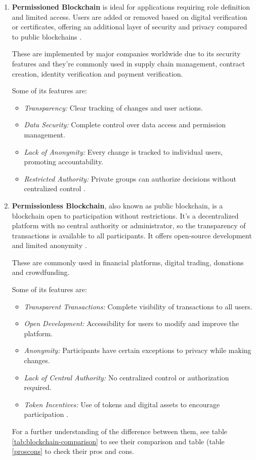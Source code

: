 \begin{enumerate}
    \item \textbf{Permissioned Blockchain} is ideal for applications requiring role definition and limited access. Users are added or removed based on digital verification or certificates, offering an additional layer of security and privacy compared to public blockchains \cite{bc_types, perm_bc}.

These are implemented by major companies worldwide due to its security features and they're commonly used in supply chain management, contract creation, identity verification and payment verification.

Some of its features are:

\begin{itemize}
    \item \textit{Transparency:} Clear tracking of changes and user actions.
    \item \textit{Data Security:} Complete control over data access and permission management.
    \item \textit{Lack of Anonymity:} Every change is tracked to individual users, promoting accountability.
    \item \textit{Restricted Authority:} Private groups can authorize decisions without centralized control \cite{perm_bc}.
\end{itemize}

    \item \textbf{Permissionless Blockchain}, also known as public blockchain, is a blockchain open to participation without restrictions. It's a decentralized platform with no central authority or administrator, so the transparency of transactions is available to all participants.
It offers open-source development and limited anonymity \cite{bc_types, perm_bc}.


These are commonly used in financial platforms, digital trading, donations and crowdfunding.\newline

Some of its features are:

\begin{itemize}
    \item \textit{Transparent Transactions:} Complete visibility of transactions to all users.
    \item \textit{Open Development:} Accessibility for users to modify and improve the platform.
    \item \textit{Anonymity:} Participants have certain exceptions to privacy while making changes.
    \item \textit{Lack of Central Authority:} No centralized control or authorization required.
    \item \textit{Token Incentives:} Use of tokens and digital assets to encourage participation \cite{perm_bc}.
\end{itemize}

For a further understanding of the difference between them, see table \ref{tab:blockchain-comparison} to see their comparison and table (table \ref{proscons} to check their pros and cons.\newline
\end{enumerate}


